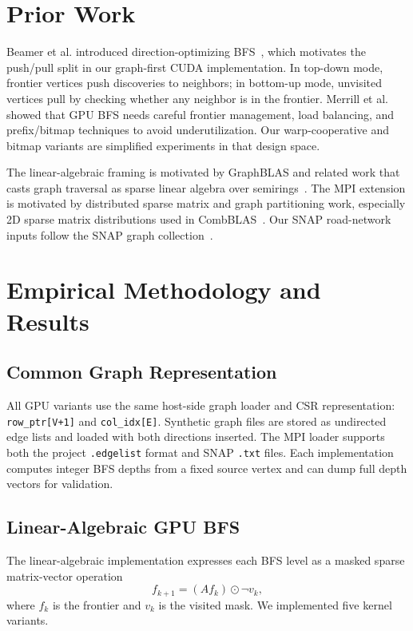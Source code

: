 \documentclass[11pt]{article}
\begin{document}
\section{Prior Work}

Beamer et al. introduced direction-optimizing BFS~\cite{beamer2012}, which
motivates the push/pull split in our graph-first CUDA implementation. In
top-down mode,
frontier vertices push discoveries to neighbors; in bottom-up mode, unvisited
vertices pull by checking whether any neighbor is in the frontier. Merrill et
al.~\cite{merrill2012} showed that GPU BFS needs careful frontier management,
load balancing, and prefix/bitmap techniques to avoid underutilization. Our
warp-cooperative and bitmap variants are simplified experiments in that design
space.

The linear-algebraic framing is motivated by GraphBLAS and related work that
casts graph traversal as sparse linear algebra over semirings~\cite{kepner2016}.
The MPI extension is motivated by distributed sparse matrix and graph
partitioning work, especially 2D sparse matrix distributions used in
CombBLAS~\cite{buluc2011}. Our SNAP road-network inputs follow the SNAP graph
collection~\cite{snap}.

\section{Empirical Methodology and Results}

\subsection{Common Graph Representation}

All GPU variants use the same host-side graph loader and CSR representation:
\texttt{row\_ptr[V+1]} and \texttt{col\_idx[E]}. Synthetic graph files are
stored as undirected edge lists and loaded with both directions inserted. The
MPI loader supports both the project \texttt{.edgelist} format and SNAP
\texttt{.txt} files. Each implementation computes integer BFS depths from a
fixed source vertex and can dump full depth vectors for validation.

\subsection{Linear-Algebraic GPU BFS}

The linear-algebraic implementation expresses each BFS level as a masked sparse
matrix-vector operation
\[
    f_{k+1} = (A f_k) \odot \neg v_k,
\]
where $f_k$ is the frontier and $v_k$ is the visited mask. We implemented five
kernel variants.
\end{document}
